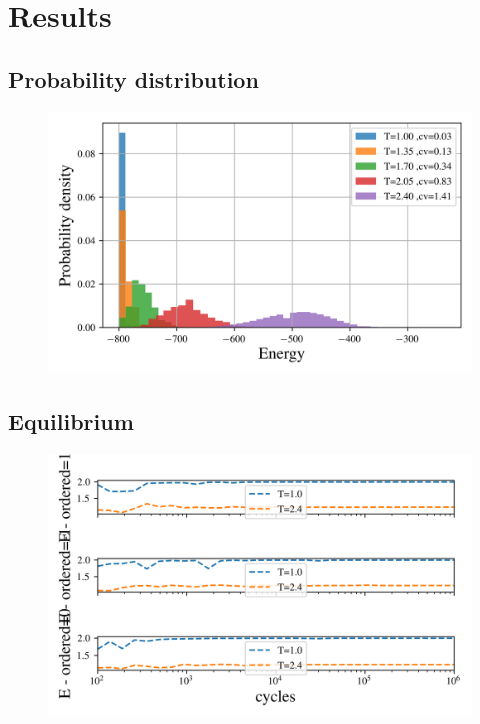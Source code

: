 \section{Results}


\subsection{Probability distribution}

\begin{figure}[H]
  \centering
  \includegraphics[width=\textwidth]{../figures/distribution.png}
  \caption{}
  \label{fig:distribution}
\end{figure}


\subsection{Equilibrium}

\begin{figure}[H]
  \centering
  \includegraphics[width=\textwidth]{../figures/equilibrium_E.png}
  \caption{}
  \label{fig:equi_E}
\end{figure}


